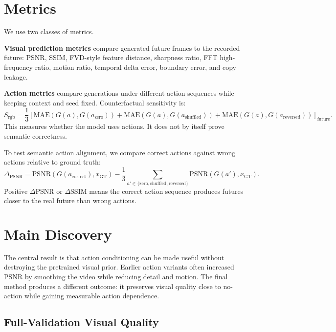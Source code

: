 \documentclass[10pt]{article}
\begin{document}
\section{Metrics}

We use two classes of metrics.

\textbf{Visual prediction metrics} compare generated future frames to the recorded future: PSNR, SSIM, FVD-style feature distance, sharpness ratio, FFT high-frequency ratio, motion ratio, temporal delta error, boundary error, and copy leakage.

\textbf{Action metrics} compare generations under different action sequences while keeping context and seed fixed. Counterfactual sensitivity is:
\[
S_{\mathrm{rgb}}
=
\frac{1}{3}
\left[
\mathrm{MAE}(G(a),G(a_{\mathrm{zero}}))
+ \mathrm{MAE}(G(a),G(a_{\mathrm{shuffled}}))
+ \mathrm{MAE}(G(a),G(a_{\mathrm{reversed}}))
\right]_{\mathrm{future}}.
\]
This measures whether the model uses actions. It does not by itself prove semantic correctness.

To test semantic action alignment, we compare correct actions against wrong actions relative to ground truth:
\[
\Delta_{\mathrm{PSNR}}
=
\mathrm{PSNR}(G(a_{\mathrm{correct}}), x_{\mathrm{GT}})
-
\frac{1}{3}
\sum_{a'\in\{\mathrm{zero,shuffled,reversed}\}}
\mathrm{PSNR}(G(a'), x_{\mathrm{GT}}).
\]
Positive $\Delta$PSNR or $\Delta$SSIM means the correct action sequence produces futures closer to the real future than wrong actions.

\section{Main Discovery}

The central result is that action conditioning can be made useful without destroying the pretrained visual prior. Earlier action variants often increased PSNR by smoothing the video while reducing detail and motion. The final method produces a different outcome: it preserves visual quality close to no-action while gaining measurable action dependence.

\subsection{Full-Validation Visual Quality}
\end{document}
